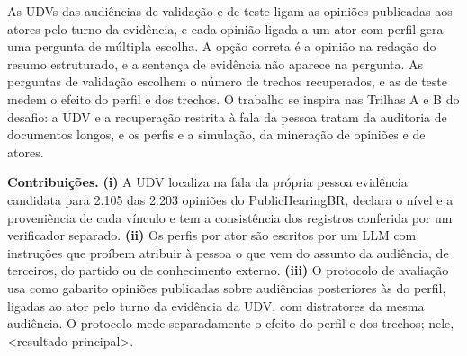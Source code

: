As UDVs das audiências de validação e de teste ligam as opiniões publicadas aos atores pelo turno da
evidência, e cada opinião ligada a um ator com perfil gera uma pergunta de múltipla escolha. A opção
correta é a opinião na redação do resumo estruturado, e a sentença de evidência não aparece na
pergunta. As perguntas de validação escolhem o número de trechos recuperados, e as de teste medem o
efeito do perfil e dos trechos. O trabalho se inspira nas Trilhas A e B do desafio: a UDV e a
recuperação restrita à fala da pessoa tratam da auditoria de documentos longos, e os perfis e a
simulação, da mineração de opiniões e de atores.

\medskip\noindent\textbf{Contribui\c{c}\~oes.} \textbf{(i)} A UDV localiza na fala da própria pessoa
evidência candidata para 2.105 das 2.203 opiniões do PublicHearingBR, declara o nível e a
proveniência de cada vínculo e tem a consistência dos registros conferida por um verificador
separado. \textbf{(ii)} Os perfis por ator são escritos por um LLM com instruções que proíbem
atribuir à pessoa o que vem do assunto da audiência, de terceiros, do partido ou de conhecimento
externo. \textbf{(iii)} O protocolo de avaliação usa como gabarito opiniões publicadas sobre
audiências posteriores às do perfil, ligadas ao ator pelo turno da evidência da UDV, com distratores
da mesma audiência. O protocolo mede separadamente o efeito do perfil e dos trechos; nele,
<resultado principal>.
